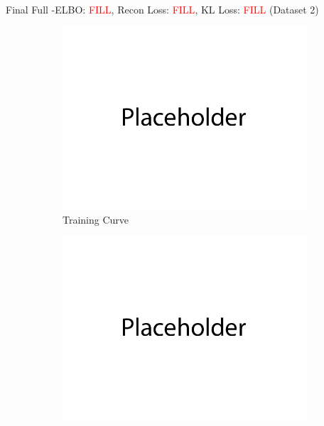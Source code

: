\documentclass{article}
\begin{document}
\begin{enumerate}[(a)]
           \newpage

           Final Full -ELBO: \textcolor{red}{FILL}, Recon Loss: \textcolor{red}{FILL}, KL Loss: \textcolor{red}{FILL} (Dataset 2)
           \begin{figure}[H]
                  \centering
                  \begin{subfigure}[b]{0.475\textwidth}
                      \centering
                      \includegraphics[width=\textwidth]{figures/q2_b_dset2_train_plot.png}
                      \caption{Training Curve}
                  \end{subfigure}
                  \hfill
                  \begin{subfigure}[b]{0.475\textwidth}
                      \centering
                      \includegraphics[width=\textwidth]{figures/q2_b_dset2_samples.png}

\end{subfigure}
\end{figure}
\end{enumerate}
\end{document}
